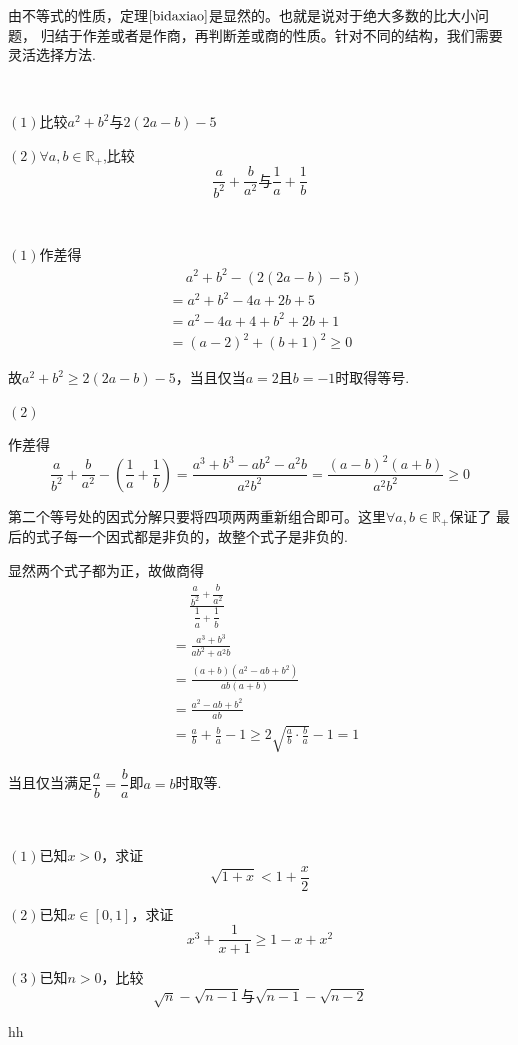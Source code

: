 由不等式的性质，定理$\ref*{bidaxiao}$是显然的。也就是说对于绝大多数的比大小问题，
归结于作差或者是作商，再判断差或商的性质。针对不同的结构，我们需要灵活选择方法.
\begin{example}
    \ 

    $(1)$比较$a^2+b^2$与$2(2a-b)-5$

    $(2)$$\forall a,b\in\mathbb{R}_+$,比较
    \[\frac{a}{b^2}+\frac{b}{a^2}\text{与}\frac{1}{a}+\frac{1}{b}\]
\end{example}
\begin{jie}
    \ 

    $(1)$作差得
    \begin{align*}
    &\quad\  a^2+b^2-(2(2a-b)-5)\\
    &=a^2+b^2-4a+2b+5\\
    &=a^2-4a+4+b^2+2b+1\\
    &=(a-2)^2+(b+1)^2 \geq 0
    \end{align*}
    
    故$a^2+b^2\geq 2(2a-b)-5$，当且仅当$a=2$且$b=-1$时取得等号.

    $(2)$
    \begin{way1}
    作差得
    \[\frac{a}{b^2}+\frac{b}{a^2}-(\frac{1}{a}+\frac{1}{b})
    =\frac{a^3+b^3-ab^2-a^2b}{a^2b^2}=\frac{(a-b)^2(a+b)}{a^2b^2}\geq0\]

    第二个等号处的因式分解只要将四项两两重新组合即可。这里$\forall a,b\in\mathbb{R}_+$保证了
    最后的式子每一个因式都是非负的，故整个式子是非负的.
    \end{way1}
    \begin{way2}
    显然两个式子都为正，故做商得
    \begin{align*}
    &\quad\ \frac{\dfrac{a}{b^2}+\dfrac{b}{a^2}}{\dfrac{1}{a}+\dfrac{1}{b}}\\
    &=\frac{a^3+b^3}{ab^2+a^2b}\\
    &=\frac{(a+b)(a^2-ab+b^2)}{ab(a+b)}\\
    &=\frac{a^2-ab+b^2}{ab}\\
    &=\frac{a}{b}+\frac{b}{a}-1 \geq 2\sqrt{\frac{a}{b}\cdot \frac{b}{a}}-1=1
    \end{align*}

    当且仅当满足$\dfrac{a}{b}=\dfrac{b}{a}$即$a=b$时取等.
    \end{way2}
\end{jie}
\begin{example}
    \ 

    $(1)$已知$x>0$，求证\[\sqrt{1+x}<1+\dfrac{x}{2}\]
    
    $(2)$已知$x\in[0,1]$，求证\[x^3+\frac{1}{x+1}\geq 1-x+x^2\]

    $(3)$已知$n>0$，比较\[\sqrt{n}-\sqrt{n-1}\text{与}\sqrt{n-1}-\sqrt{n-2}\]
\end{example}





\begin{proposition}
    hh
    
\end{proposition}












\clearpage
